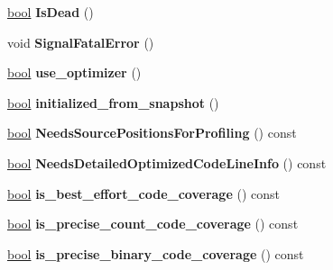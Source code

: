 \begin{DoxyCompactItemize}
\mbox{\hyperlink{classbool}{bool}} {\bfseries Is\+Dead} ()
\item 
\mbox{\label{classv8_1_1internal_1_1Isolate_a18952815b74f3997aea19ff764024199}} 
void {\bfseries Signal\+Fatal\+Error} ()
\item 
\mbox{\label{classv8_1_1internal_1_1Isolate_af4f6612dba19ccb7a237f0ca07f272da}} 
\mbox{\hyperlink{classbool}{bool}} {\bfseries use\+\_\+optimizer} ()
\item 
\mbox{\label{classv8_1_1internal_1_1Isolate_a6e80a9209b48fcff29a72025a5e793a5}} 
\mbox{\hyperlink{classbool}{bool}} {\bfseries initialized\+\_\+from\+\_\+snapshot} ()
\item 
\mbox{\label{classv8_1_1internal_1_1Isolate_a08db6c5848abfb343501274deb2ca3a9}} 
\mbox{\hyperlink{classbool}{bool}} {\bfseries Needs\+Source\+Positions\+For\+Profiling} () const
\item 
\mbox{\label{classv8_1_1internal_1_1Isolate_a5ff984a133af734f748f1e0ce813948f}} 
\mbox{\hyperlink{classbool}{bool}} {\bfseries Needs\+Detailed\+Optimized\+Code\+Line\+Info} () const
\item 
\mbox{\label{classv8_1_1internal_1_1Isolate_a28821a79c6ebf0bfcd8c01441d517e14}} 
\mbox{\hyperlink{classbool}{bool}} {\bfseries is\+\_\+best\+\_\+effort\+\_\+code\+\_\+coverage} () const
\item 
\mbox{\label{classv8_1_1internal_1_1Isolate_abd52f319cbfe52b7261dabaf2754efd1}} 
\mbox{\hyperlink{classbool}{bool}} {\bfseries is\+\_\+precise\+\_\+count\+\_\+code\+\_\+coverage} () const
\item 
\mbox{\label{classv8_1_1internal_1_1Isolate_a4666870bdfec4b5e653477b2f138a5be}} 
\mbox{\hyperlink{classbool}{bool}} {\bfseries is\+\_\+precise\+\_\+binary\+\_\+code\+\_\+coverage} () const
\item 
\mbox{\label{classv8_1_1internal_1_1Isolate_a9eaeff694f67be24c814ef2552fe0f4f}} 

\end{DoxyCompactItemize}
